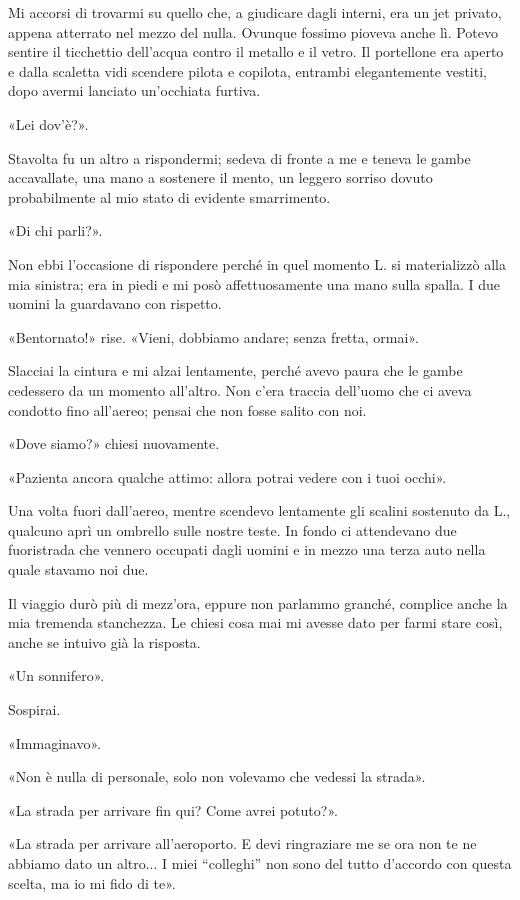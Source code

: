 \documentclass[a4paper,12pt]{book}
\begin{document}
Mi accorsi di trovarmi su quello che, a giudicare dagli interni, era un jet
privato, appena atterrato nel mezzo del nulla. Ovunque fossimo pioveva anche lì.
Potevo sentire il ticchettio dell'acqua contro il metallo e il vetro. Il
portellone era aperto e dalla scaletta vidi scendere pilota e copilota, entrambi
elegantemente vestiti, dopo avermi lanciato un'occhiata furtiva.

«Lei dov'è?».

Stavolta fu un altro a rispondermi; sedeva di fronte a me e teneva le gambe
accavallate, una mano a sostenere il mento, un leggero sorriso dovuto
probabilmente al mio stato di evidente smarrimento.

«Di chi parli?».

Non ebbi l'occasione di rispondere perché in quel momento L. si materializzò
alla mia sinistra; era in piedi e mi posò affettuosamente una mano sulla spalla.
I due uomini la guardavano con rispetto.

«Bentornato!» rise. «Vieni, dobbiamo andare; senza fretta, ormai».

Slacciai la cintura e mi alzai lentamente, perché avevo paura che le gambe
cedessero da un momento all'altro. Non c'era traccia dell'uomo che ci aveva
condotto fino all'aereo; pensai che non fosse salito con noi.

«Dove siamo?» chiesi nuovamente.

«Pazienta ancora qualche attimo: allora potrai vedere con i tuoi occhi».

Una volta fuori dall'aereo, mentre scendevo lentamente gli scalini sostenuto
da L., qualcuno aprì un ombrello sulle nostre teste. In fondo ci attendevano due
fuoristrada che vennero occupati dagli uomini e in mezzo una terza auto nella
quale stavamo noi due.

Il viaggio durò più di mezz'ora, eppure non parlammo granché, complice anche la
mia tremenda stanchezza. Le chiesi cosa mai mi avesse dato per farmi stare così,
anche se intuivo già la risposta.

«Un sonnifero».

Sospirai.

«Immaginavo».

«Non è nulla di personale, solo non volevamo che vedessi la strada».

«La strada per arrivare fin qui? Come avrei potuto?».

«La strada per arrivare all'aeroporto. E devi ringraziare me se ora non te ne
abbiamo dato un altro... I miei ``colleghi'' non sono del tutto d'accordo con
questa scelta, ma io mi fido di te».
\end{document}
